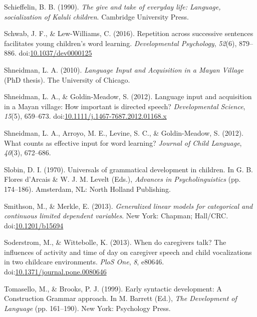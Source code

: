 \documentclass[,man,floatsintext]{apa6}
\begin{document}
\hypertarget{ref-schieffelin1990give}{}
Schieffelin, B. B. (1990). \emph{The give and take of everyday life:
Language, socialization of Kaluli children}. Cambridge University Press.

\hypertarget{ref-schwab2016repetition}{}
Schwab, J. F., \& Lew-Williams, C. (2016). Repetition across successive
sentences facilitates young children's word learning.
\emph{Developmental Psychology}, \emph{52}(6), 879--886.
doi:\href{https://doi.org/10.1037/dev0000125}{10.1037/dev0000125}

\hypertarget{ref-shneidman2010language}{}
Shneidman, L. A. (2010). \emph{Language Input and Acquisition in a Mayan
Village} (PhD thesis). The University of Chicago.

\hypertarget{ref-shneidman2012language}{}
Shneidman, L. A., \& Goldin-Meadow, S. (2012). Language input and
acquisition in a Mayan village: How important is directed speech?
\emph{Developmental Science}, \emph{15}(5), 659--673.
doi:\href{https://doi.org/10.1111/j.1467-7687.2012.01168.x}{10.1111/j.1467-7687.2012.01168.x}

\hypertarget{ref-shneidman2012counts}{}
Shneidman, L. A., Arroyo, M. E., Levine, S. C., \& Goldin-Meadow, S.
(2012). What counts as effective input for word learning? \emph{Journal
of Child Language}, \emph{40}(3), 672--686.

\hypertarget{ref-slobin1970universals}{}
Slobin, D. I. (1970). Universals of grammatical development in children.
In G. B. Flores d'Arcais \& W. J. M. Levelt (Eds.), \emph{Advances in
Psycholinguistics} (pp. 174--186). Amsterdam, NL: North Holland
Publishing.

\hypertarget{ref-smithson2013generalized}{}
Smithson, M., \& Merkle, E. (2013). \emph{Generalized linear models for
categorical and continuous limited dependent variables}. New York:
Chapman; Hall/CRC.
doi:\href{https://doi.org/10.1201/b15694}{10.1201/b15694}

\hypertarget{ref-soderstrom2013when}{}
Soderstrom, M., \& Wittebolle, K. (2013). When do caregivers talk? The
influences of activity and time of day on caregiver speech and child
vocalizations in two childcare environments. \emph{PloS One}, \emph{8},
e80646.
doi:\href{https://doi.org/10.1371/journal.pone.0080646}{10.1371/journal.pone.0080646}

\hypertarget{ref-tomasello1999early}{}
Tomasello, M., \& Brooks, P. J. (1999). Early syntactic development: A
Construction Grammar approach. In M. Barrett (Ed.), \emph{The
Development of Language} (pp. 161--190). New York: Psychology Press.
\end{document}

